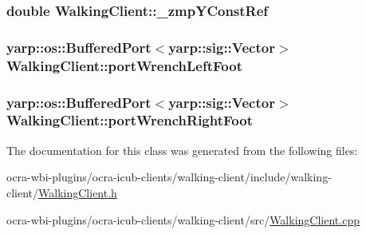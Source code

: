 \hypertarget{classWalkingClient_a6cba3194816a0be78a8b17d539806115}{
\subsubsection[{\-\_\-zmp\-Y\-Const\-Ref}]{\setlength{\rightskip}{0pt plus 5cm}double {\bf \-Walking\-Client\-::\-\_\-zmp\-Y\-Const\-Ref}}}\label{classWalkingClient_a6cba3194816a0be78a8b17d539806115}
\hypertarget{classWalkingClient_a88ee63ff6a341eccd458d24700383457}{
\subsubsection[{port\-Wrench\-Left\-Foot}]{\setlength{\rightskip}{0pt plus 5cm}yarp\-::os\-::\-Buffered\-Port$<$yarp\-::sig\-::\-Vector$>$ {\bf \-Walking\-Client\-::port\-Wrench\-Left\-Foot}}}\label{classWalkingClient_a88ee63ff6a341eccd458d24700383457}
\hypertarget{classWalkingClient_a96321dc60e84c193f2dea6e85983ca67}{
\subsubsection[{port\-Wrench\-Right\-Foot}]{\setlength{\rightskip}{0pt plus 5cm}yarp\-::os\-::\-Buffered\-Port$<$yarp\-::sig\-::\-Vector$>$ {\bf \-Walking\-Client\-::port\-Wrench\-Right\-Foot}}}\label{classWalkingClient_a96321dc60e84c193f2dea6e85983ca67}


\-The documentation for this class was generated from the following files\-:\begin{DoxyCompactItemize}
\item 
ocra-\/wbi-\/plugins/ocra-\/icub-\/clients/walking-\/client/include/walking-\/client/\hyperlink{WalkingClient_8h}{\-Walking\-Client.\-h}\item 
ocra-\/wbi-\/plugins/ocra-\/icub-\/clients/walking-\/client/src/\hyperlink{WalkingClient_8cpp}{\-Walking\-Client.\-cpp}\end{DoxyCompactItemize}
